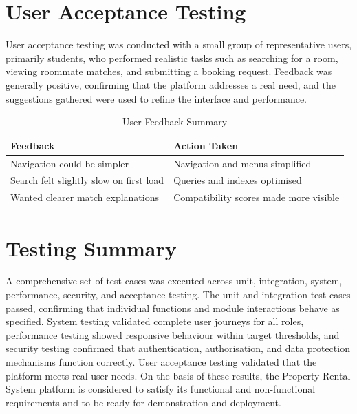 
\section{User Acceptance Testing}

User acceptance testing was conducted with a small group of representative users, primarily students, who performed realistic tasks such as searching for a room, viewing roommate matches, and submitting a booking request. Feedback was generally positive, confirming that the platform addresses a real need, and the suggestions gathered were used to refine the interface and performance.

\begin{table}[h]
\centering
\caption{User Feedback Summary}
\begin{tabularx}{\textwidth}{|X|X|}
\hline
\textbf{Feedback} & \textbf{Action Taken} \\
\hline
Navigation could be simpler & Navigation and menus simplified \\
\hline
Search felt slightly slow on first load & Queries and indexes optimised \\
\hline
Wanted clearer match explanations & Compatibility scores made more visible \\
\hline
\end{tabularx}
\end{table}


\section{Testing Summary}

A comprehensive set of test cases was executed across unit, integration, system, performance, security, and acceptance testing. The unit and integration test cases passed, confirming that individual functions and module interactions behave as specified. System testing validated complete user journeys for all roles, performance testing showed responsive behaviour within target thresholds, and security testing confirmed that authentication, authorisation, and data protection mechanisms function correctly. User acceptance testing validated that the platform meets real user needs. On the basis of these results, the Property Rental System platform is considered to satisfy its functional and non-functional requirements and to be ready for demonstration and deployment.
